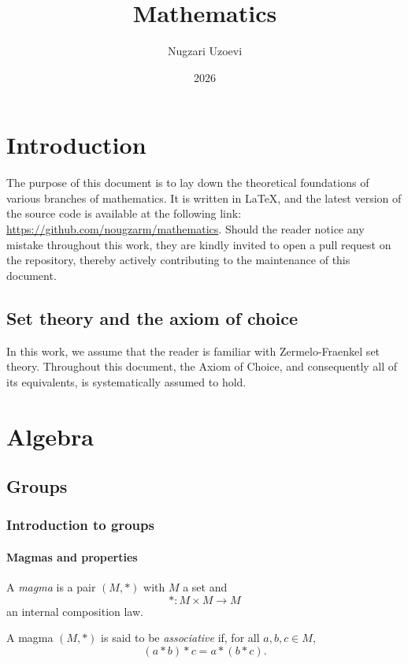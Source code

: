 \documentclass[12pt]{report}
\title{Mathematics}
\author{Nugzari Uzoevi}
\date{2026}
\begin{document}
\maketitle
\tableofcontents


\chapter*{Introduction}
\label{ch-introduction}

The purpose of this document is to lay down the theoretical foundations of various branches of mathematics. It is written in LaTeX, and the latest version of the source code is available at the following link: \url{https://github.com/nougzarm/mathematics}. Should the reader notice any mistake throughout this work, they are kindly invited to open a pull request on the repository, thereby actively contributing to the maintenance of this document.

\section*{Set theory and the axiom of choice}

In this work, we assume that the reader is familiar with Zermelo-Fraenkel set theory. Throughout this document, the Axiom of Choice, and consequently all of its equivalents, is systematically assumed to hold.


\chapter{Algebra}
\section{Groups}
\subsection{Introduction to groups}
\subsubsection{Magmas and properties}

\begin{definition} \label{def-magma}
    A \emph{magma} is a pair $(M, \ast)$ with $M$ a set and 
    \[
        \ast \colon M \times M \to M
    \]
    an internal composition law.
\end{definition}

\begin{definition} \label{def-magma-associative}
    A magma $(M, \ast)$ is said to be \emph{associative} if, for all $a, b, c \in M$,
    \[
        (a \ast b) \ast c = a \ast (b \ast c).
    \]
\end{definition}
\end{document}
